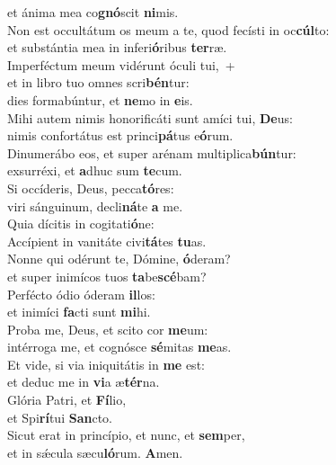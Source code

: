 \oddverse et ánima mea co\textbf{gnó}scit \textbf{ni}mis.\\
\evenverse Non est occultátum os meum a te, quod fecísti in oc\textbf{cúl}to:~\*\\
\evenverse et substántia mea in inferi\textbf{ó}ribus \textbf{ter}ræ.\\
\oddverse Imperféctum meum vidérunt óculi tui,~+\\
\oddverse  et in libro tuo omnes scri\textbf{bén}tur:~\*\\
\oddverse dies formabúntur, et \textbf{ne}mo in \textbf{e}is.\\
\evenverse Mihi autem nimis honorificáti sunt amíci tui, \textbf{De}us:~\*\\
\evenverse nimis confortátus est princi\textbf{pá}tus e\textbf{ó}rum.\\
\oddverse Dinumerábo eos, et super arénam multiplica\textbf{bún}tur:~\*\\
\oddverse exsurréxi, et \textbf{a}dhuc sum \textbf{te}cum.\\
\evenverse Si occíderis, Deus, pecca\textbf{tó}res:~\*\\
\evenverse viri sánguinum, decli\textbf{ná}te \textbf{a} me.\\
\oddverse Quia dícitis in cogitati\textbf{ó}ne:~\*\\
\oddverse Accípient in vanitáte civi\textbf{tá}tes \textbf{tu}as.\\
\evenverse Nonne qui odérunt te, Dómine, \textbf{ó}deram?~\*\\
\evenverse et super inimícos tuos \textbf{ta}be\textbf{scé}bam?\\
\oddverse Perfécto ódio óderam \textbf{il}los:~\*\\
\oddverse et inimíci \textbf{fa}cti sunt \textbf{mi}hi.\\
\evenverse Proba me, Deus, et scito cor \textbf{me}um:~\*\\
\evenverse intérroga me, et cognósce \textbf{sé}mitas \textbf{me}as.\\
\oddverse Et vide, si via iniquitátis in \textbf{me} est:~\*\\
\oddverse et deduc me in \textbf{vi}a æ\textbf{tér}na.\\
\evenverse Glória Patri, et \textbf{Fí}lio,~\*\\
\evenverse et Spi\textbf{rí}tui \textbf{San}cto.\\
\oddverse Sicut erat in princípio, et nunc, et \textbf{sem}per,~\*\\
\oddverse et in sǽcula sæcu\textbf{ló}rum. \textbf{A}men.\\
